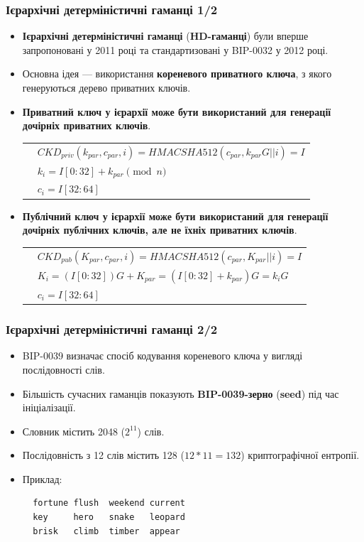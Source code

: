 \documentclass{beamer}
\begin{document}
\begin{frame}[fragile]
  \frametitle{Ієрархічні детерміністичні гаманці 1/2}
  \begin{itemize}
  \item \textbf{Ієрархічні детерміністичні гаманці} (\textbf{HD-гаманці}) були
    вперше запропоновані у 2011 році та стандартизовані у BIP-0032 у 2012 році.
  \item Основна ідея — використання \textbf{кореневого приватного ключа}, з
    якого генеруються дерево приватних ключів.
  \item \textbf{Приватний ключ у ієрархії може бути використаний для генерації
      дочірніх приватних ключів}.
    \begin{tabular}{rl}
      &${\scriptstyle \mathit{CKD_{priv}}(k_{par}, c_{par}, i) = \mathit{HMACSHA512}(c_{par},
        k_{par}G||i) = I}$ \\
      &${\scriptstyle k_i = I[0:32] + k_{par} \pmod{n}}$ \\
      &${\scriptstyle c_i = I[32:64]}$ \\
    \end{tabular}
  \item \textbf{Публічний ключ у ієрархії може бути використаний для генерації
      дочірніх публічних ключів, але не їхніх приватних ключів}.
    \begin{tabular}{rl}
      &${\scriptstyle \mathit{CKD_{pub}}(K_{par}, c_{par}, i) = \mathit{HMACSHA512}(c_{par},
        K_{par}||i) = I}$ \\
      &${\scriptstyle K_i = (I[0:32])G + K_{par} = (I[0:32] + k_{par})G = k_iG}$ \\
      &${\scriptstyle c_i = I[32:64]}$ \\
    \end{tabular}
  \end{itemize}
\end{frame}

\begin{frame}[fragile]
  \frametitle{Ієрархічні детерміністичні гаманці 2/2}
  \begin{itemize}
  \item BIP-0039 визначає спосіб кодування кореневого ключа у вигляді
    послідовності слів.
  \item Більшість сучасних гаманців показують \textbf{BIP-0039-зерно}
    (\textbf{seed}) під час ініціалізації.
  \item Словник містить 2048 ($2^{11}$) слів.
  \item Послідовність з 12 слів містить 128 ($12 * 11 = 132$) криптографічної
    ентропії.
  \item Приклад:
\begin{verbatim}
  fortune flush  weekend current
  key     hero   snake   leopard
  brisk   climb  timber  appear
\end{verbatim}
  \end{itemize}
\end{frame}
\end{document}
